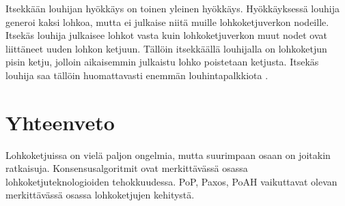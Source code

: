 \documentclass[utf8,bachelor]{gradu3}
\begin{document}
Itsekkään louhijan hyökkäys on toinen yleinen hyökkäys. Hyökkäyksessä louhija generoi kaksi lohkoa, mutta ei julkaise niitä muille lohkoketjuverkon nodeille. Itsekäs louhija julkaisee lohkot vasta kuin lohkoketjuverkon muut nodet ovat liittäneet uuden lohkon ketjuun. Tällöin itsekkäällä louhijalla on lohkoketjun pisin ketju, jolloin aikaisemmin julkaistu lohko poistetaan ketjusta. Itsekäs louhija saa tällöin huomattavasti enemmän louhintapalkkiota \parencite{zheng2017overview}. 




 \chapter{Yhteenveto}
 
 Lohkoketjuissa on vielä paljon ongelmia, mutta suurimpaan osaan on joitakin ratkaisuja.
 Konsensusalgoritmit ovat merkittävässä osassa lohkoketjuteknologioiden tehokkuudessa.
 PoP, Paxos, PoAH vaikuttavat olevan merkittävässä osassa lohkoketjujen kehitystä.
 
 
 


\printbibliography

\appendix
\end{document}
